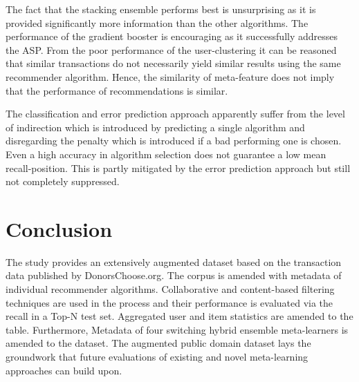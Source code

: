 \documentclass[runningheads]{llncs}
\begin{document}
The fact that the stacking ensemble performs best is unsurprising as it is provided significantly more information than the other algorithms. The performance of the gradient booster is encouraging as it successfully addresses the ASP. From the poor performance of the user-clustering it can be reasoned that similar transactions do not necessarily yield similar results using the same recommender algorithm. Hence, the similarity of meta-feature does not imply that the performance of recommendations is similar.

The classification and error prediction approach apparently suffer from the level of indirection which is introduced by predicting a single algorithm and disregarding the penalty which is introduced if a bad performing one is chosen. Even a high accuracy in algorithm selection does not guarantee a low mean recall-position. This is partly mitigated by the error prediction approach but still not completely suppressed.

\section{Conclusion}
The study provides an extensively augmented dataset based on the transaction data published by DonorsChoose.org. The corpus is amended with metadata of individual recommender algorithms. Collaborative and content-based filtering techniques are used in the process and their performance is evaluated via the recall in a Top-N test set. Aggregated user and item statistics are amended to the table. Furthermore, Metadata of four switching hybrid ensemble meta-learners is amended to the dataset. The augmented public domain dataset lays the groundwork that future evaluations of existing and novel meta-learning approaches can build upon.

\begin{appendix}
	\printbibliography[heading=bibintoc]
\end{appendix}
\end{document}
